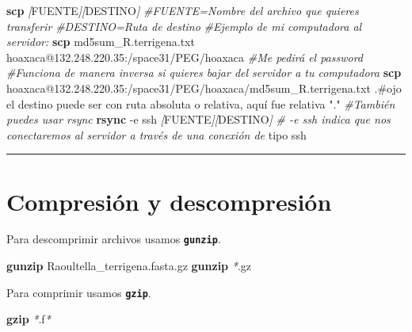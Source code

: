 \documentclass[
]{book}
\newenvironment{Shaded}{\begin{snugshade}}{\end{snugshade}}
\newcommand{\AttributeTok}[1]{\textcolor[rgb]{0.13,0.29,0.53}{#1}}
\newcommand{\CommentTok}[1]{\textcolor[rgb]{0.56,0.35,0.01}{\textit{#1}}}
\newcommand{\ExtensionTok}[1]{#1}
\newcommand{\FunctionTok}[1]{\textcolor[rgb]{0.13,0.29,0.53}{\textbf{#1}}}
\newcommand{\KeywordTok}[1]{\textcolor[rgb]{0.13,0.29,0.53}{\textbf{#1}}}
\newcommand{\NormalTok}[1]{#1}
\newcommand{\PreprocessorTok}[1]{\textcolor[rgb]{0.56,0.35,0.01}{\textit{#1}}}
\newcommand{\SpecialStringTok}[1]{\textcolor[rgb]{0.31,0.60,0.02}{#1}}
\newcommand{\StringTok}[1]{\textcolor[rgb]{0.31,0.60,0.02}{#1}}
\begin{document}
\begin{Shaded}
\begin{Highlighting}[]
\KeywordTok{\textasciigrave{}}\FunctionTok{scp}\KeywordTok{\textasciigrave{}} \PreprocessorTok{[}\SpecialStringTok{FUENTE}\PreprocessorTok{][}\SpecialStringTok{DESTINO}\PreprocessorTok{]}
\CommentTok{\#FUENTE=Nombre del archivo que quieres transferir}
\CommentTok{\#DESTINO=Ruta de destino}
\CommentTok{\#Ejemplo de mi computadora al servidor:}
\FunctionTok{scp}\NormalTok{ md5sum\_R.terrigena.txt hoaxaca@132.248.220.35:/space31/PEG/hoaxaca}
\CommentTok{\#Me pedirá el password}
\CommentTok{\#Funciona de manera inversa si quieres bajar del servidor a tu computadora}
\FunctionTok{scp}\NormalTok{ hoaxaca@132.248.220.35:/space31/PEG/hoaxaca/md5sum\_R.terrigena.txt .\#ojo el}
\ExtensionTok{destino}\NormalTok{ puede ser con ruta absoluta o relativa, aquí fue relativa }\StringTok{"."}
\CommentTok{\#También puedes usar rsync}
\KeywordTok{\textasciigrave{}}\FunctionTok{rsync} \AttributeTok{{-}e}\NormalTok{ ssh}\KeywordTok{\textasciigrave{}} \PreprocessorTok{[}\SpecialStringTok{FUENTE}\PreprocessorTok{][}\SpecialStringTok{DESTINO}\PreprocessorTok{]}
\CommentTok{\# {-}e ssh indica que nos conectaremos al servidor a través de una conexión de}
\ExtensionTok{tipo}\NormalTok{ ssh}
\end{Highlighting}
\end{Shaded}

\begin{center}\rule{0.5\linewidth}{0.5pt}\end{center}

\section{Compresión y descompresión}\label{compresiuxf3n-y-descompresiuxf3n}

Para descomprimir archivos usamos \textbf{\texttt{gunzip}}.

\begin{Shaded}
\begin{Highlighting}[]
\FunctionTok{gunzip}\NormalTok{ Raoultella\_terrigena.fasta.gz}
\FunctionTok{gunzip} \PreprocessorTok{*}\NormalTok{.gz}
\end{Highlighting}
\end{Shaded}

Para comprimir usamos \textbf{\texttt{gzip}}.

\begin{Shaded}
\begin{Highlighting}[]
\FunctionTok{gzip} \PreprocessorTok{*}\NormalTok{.f}\PreprocessorTok{*}
\end{Highlighting}
\end{Shaded}
\end{document}

